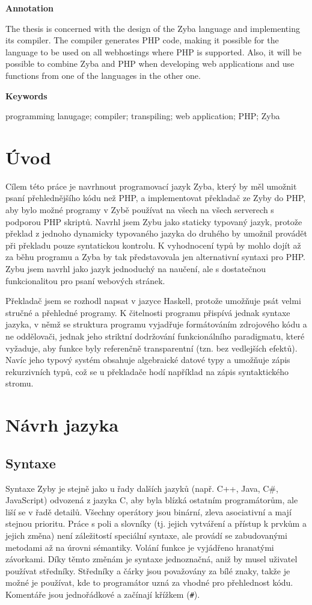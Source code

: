 \documentclass[a4paper,12pt]{article}
\begin{document}
\Large\textbf{Annotation}\normalsize

The thesis is concerned with the design of the Zyba language and implementing its compiler. The compiler generates PHP code, making it possible for the language to be used on all webhostings where PHP is supported. Also, it will be possible to combine Zyba and PHP when developing web applications and use functions from one of the languages in the other one.

\Large\textbf{Keywords}\normalsize

programming lanugage; compiler; transpiling; web application; PHP; Zyba
\newpage
\thispagestyle{empty}
\tableofcontents
\newpage
\section{Úvod}
Cílem této práce je navrhnout programovací jazyk Zyba, který by měl umožnit psaní přehlednějšího kódu než PHP, a implementovat překladač ze Zyby do PHP, aby bylo možné programy v Zybě používat na všech na všech serverech s podporou PHP skriptů. Navrhl jsem Zybu jako staticky typovaný jazyk, protože překlad z jednoho dynamicky typovaného jazyka do druhého by umožnil provádět při překladu pouze syntatickou kontrolu. K vyhodnocení typů by mohlo dojít až za běhu programu a Zyba by tak představovala jen alternativní syntaxi pro PHP. Zybu jsem navrhl jako jazyk jednoduchý na naučení, ale s dostatečnou funkcionalitou pro psaní webových stránek.

Překladač jsem se rozhodl napsat v jazyce Haskell, protože umožňuje psát velmi stručné a přehledné programy. K čitelnosti programu přispívá jednak syntaxe jazyka, v němž se struktura programu vyjadřuje formátováním zdrojového kódu a ne oddělovači, jednak jeho striktní dodržování funkcionálního paradigmatu, které vyžaduje, aby funkce byly referenčně transparentní (tzn. bez vedlejších efektů). Navíc jeho typový systém obsahuje algebraické datové typy a umožňuje zápis rekurzivních typů, což se u překladače hodí například na zápis syntaktického stromu.

\section{Návrh jazyka}
\subsection{Syntaxe}
Syntaxe Zyby je stejně jako u řady dalších jazyků (např. C++, Java, C\#, JavaScript) odvozená z jazyka C, aby byla blízká ostatním programátorům, ale liší se v řadě detailů. Všechny operátory jsou binární, zleva asociativní a mají stejnou prioritu. Práce s poli a slovníky (tj. jejich vytváření a přístup k prvkům a jejich změna) není záležitostí speciální syntaxe, ale provádí se zabudovanými metodami až na úrovni sémantiky. Volání funkce je vyjádřeno hranatými závorkami. Díky těmto změnám je syntaxe jednoznačná, aniž by musel uživatel používat středníky. Středníky a čárky jsou považovány za bílé znaky, takže je možné je používat, kde to programátor uzná za vhodné pro přehlednost kódu. Komentáře jsou jednořádkové a začínají křížkem (\texttt{\#}).
\end{document}
